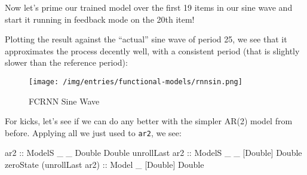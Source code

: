 \documentclass[]{article}
\newenvironment{Shaded}{}{}
\newcommand{\CommentTok}[1]{\textcolor[rgb]{0.38,0.63,0.69}{\textit{#1}}}
\newcommand{\DataTypeTok}[1]{\textcolor[rgb]{0.56,0.13,0.00}{#1}}
\newcommand{\DecValTok}[1]{\textcolor[rgb]{0.25,0.63,0.44}{#1}}
\newcommand{\FloatTok}[1]{\textcolor[rgb]{0.25,0.63,0.44}{#1}}
\newcommand{\FunctionTok}[1]{\textcolor[rgb]{0.02,0.16,0.49}{#1}}
\newcommand{\KeywordTok}[1]{\textcolor[rgb]{0.00,0.44,0.13}{\textbf{#1}}}
\newcommand{\NormalTok}[1]{#1}
\newcommand{\OtherTok}[1]{\textcolor[rgb]{0.00,0.44,0.13}{#1}}
\begin{document}
Now let's prime our trained model over the first 19 items in our sine wave and
start it running in feedback mode on the 20th item!

\begin{Shaded}
\end{Shaded}

Plotting the result against the ``actual'' sine wave of period 25, we see that
it approximates the process decently well, with a consistent period (that is
slightly slower than the reference period):

\begin{figure}
\centering
\texttt{[image: /img/entries/functional-models/rnnsin.png]}
\caption{FCRNN Sine Wave}
\end{figure}

For kicks, let's see if we can do any better with the simpler AR(2) model from
before. Applying all we just used to \texttt{ar2}, we see:

\begin{Shaded}
\begin{Highlighting}[]
\OtherTok{ar2                        ::} \DataTypeTok{ModelS}\NormalTok{ _ _  }\DataTypeTok{Double}  \DataTypeTok{Double}
\NormalTok{unrollLast}\OtherTok{ ar2             ::} \DataTypeTok{ModelS}\NormalTok{ _ _ [}\DataTypeTok{Double}\NormalTok{] }\DataTypeTok{Double}
\NormalTok{zeroState (unrollLast ar2)}\OtherTok{ ::} \DataTypeTok{Model}\NormalTok{  _   [}\DataTypeTok{Double}\NormalTok{] }\DataTypeTok{Double}
\end{Highlighting}
\end{Shaded}
\end{document}
